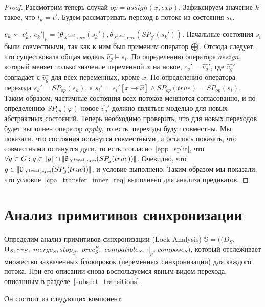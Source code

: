 \begin{proof}
Рассмотрим теперь случай $op = assign(x, exp)$. Зафиксируем значение $k$ такое, что $t_k = t'$. Будем рассматривать переход в потоке из состояния $s_k$.

$e_k \leadsto e_k'$, $e_k'|_p = (\theta_{X^{local},env}(s_k'),\theta_{X^{local},env}(SP_{q'}(s_k'))$. 
Начальные состояния $s_i$ были совместными, так как к ним был применим оператор $\mathrel{\bigoplus}$. 
Отсюда следует, что существовала общая модель $\hat{v_g} \models s_i$.
По определению оператора $assign$, который меняет только значение переменной $x$ на новое, $c_g' = \hat{v_g}'$, где $\hat{v_g}'$ совпадает с $\hat{v_g}$ для всех переменных, кроме $x$.
По определению оператора перехода $s_k' = SP_{op}(s_k)$, а $s_i' = s_i'[x \rightarrow \hat x] \land SP_{op}(true) = SP_{op}(s_i)$.
Таким образом, частичные состояния всех потоков меняются согласованно, и по определению $SP_{op}(\varphi)$ новое $\hat{v_g}'$ должно являться моделью для новых абстрактных состояний.
Теперь необходимо проверить, что для новых переходов будет выполнен оператор $apply$, то есть, переходы будут совместны.
Мы показали, что состояния останутся совместными, и осталось показать, что совместными останутся дуги, то есть, согласно~\ref{epp_split}, что $\forall g \in G: g \in \lvert \! \lvert g \rvert \! \rvert \cap \lvert \! \lvert \uptheta_{X^{local},env}(SP_{g}(true)) \rvert \! \rvert$. 
Очевидно, что $g \in \lvert \! \lvert \uptheta_{X^{local},env}(SP_{g}(true)) \rvert \! \rvert$, и условие выполнено.
Таким образом мы показали, что условие~\ref{cpa_transfer_inner_req} выполнено для анализа предикатов.

\end{proof}


\section{Анализ примитивов синхронизации}
\label{sect_lock_analysis}

Определим анализ примитивов синхронизации (Lock Analysis) $\mathbb{S}=((D_{S},$ $\Pi_{S}, \leadsto_{S},$ $merge_{S}, stop_{S},$ $prec^E_{S},$ $compatible_{S}$, $\cdot|_p$, $compose_S)$, который отслеживает множество захваченных блокировок (переменных синхронизации) для каждого потока. 
При его описании снова воспользуемся явным видом перехода, описанным в разделе~\ref{subsect_transitions}.

Он состоит из следующих компонент.

